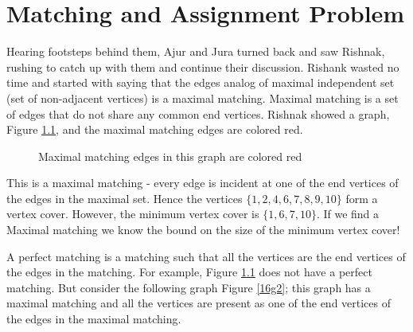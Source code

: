\chapter{Matching and Assignment Problem}

Hearing footsteps behind them, Ajur and Jura turned back and saw Rishnak, rushing to catch up with them and continue their discussion. Rishank wasted no time and started with saying that the edges analog of maximal independent set (set of non-adjacent vertices) is a maximal matching. Maximal matching is a set of edges that do not share any common end vertices. Rishnak showed a graph, Figure \ref{16g1}, and the maximal matching edges are colored red.
\begin{figure}
\begin{center}

\caption{Maximal matching edges in this graph are colored red}\label{16g1}
\end{center}
\end{figure}

This is a maximal matching - every edge is incident at one of the end vertices of the edges in the maximal set. Hence the vertices $\{1,2,4,6,7,8,9,10\}$ form a vertex cover. However, the minimum vertex cover is $\{1,6,7,10\}$. If we find a Maximal matching we know the bound on the size of the minimum vertex cover!


A perfect matching is a matching such that all the vertices are the end vertices of the edges in the matching. For example, Figure \ref{16g1} does not have a perfect matching.  But consider the following graph Figure \ref{16g2}; this graph has a maximal matching and all the vertices are present as one of the end vertices of the edges in the maximal matching.

